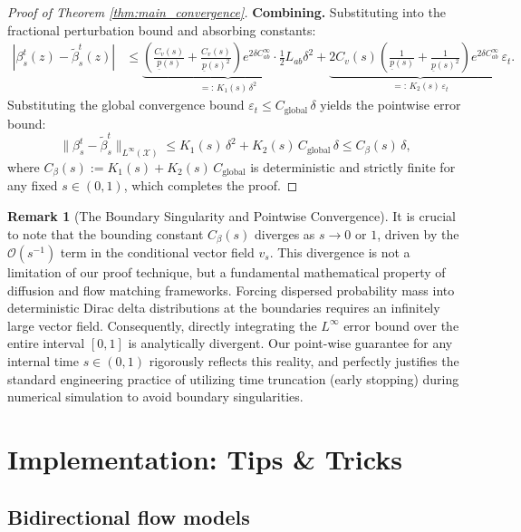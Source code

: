 \documentclass[11pt]{article}
\theoremstyle{definition}
\newtheorem{remark}[theorem]{Remark}
\numberwithin{equation}{section}%
\begin{document}
\begin{proof}[Proof of Theorem \ref{thm:main_convergence}]
\textbf{Combining.} Substituting into the fractional perturbation bound and absorbing constants:
\begin{align*}
|\beta_s^t(z) - \tilde{\beta}_s^t(z)|
&\le \underbrace{\left(\frac{C_v(s)}{\underline{p}(s)} + \frac{C_v(s)}{\underline{p}(s)^2}\right) e^{2\delta C_{ab}^\infty} \cdot \tfrac{1}{2}L_{ab}\delta^2}_{=:\,K_1(s)\,\delta^2}
+ \underbrace{2C_v(s)\!\left(\frac{1}{\underline{p}(s)} + \frac{1}{\underline{p}(s)^2}\right) e^{2\delta C_{ab}^\infty}\,\varepsilon_t}_{=:\,K_2(s)\,\varepsilon_t}.
\end{align*}
Substituting the global convergence bound $\varepsilon_t \le C_{\mathrm{global}}\,\delta$ yields the pointwise error bound:
\begin{equation}
\label{eq:pointwise_beta_bound}
\|\beta_s^t - \tilde{\beta}_s^t\|_{L^\infty(\mathcal{X})} \le K_1(s)\,\delta^2 + K_2(s)\,C_{\mathrm{global}}\,\delta \le C_\beta(s)\,\delta,
\end{equation}
where $C_\beta(s) := K_1(s) + K_2(s)\,C_{\mathrm{global}}$ is deterministic and strictly finite for any fixed $s \in (0,1)$, which completes the proof.
\end{proof}

\begin{remark}[The Boundary Singularity and Pointwise Convergence]
\label{rmk:boundary_singularity}
It is crucial to note that the bounding constant $C_\beta(s)$ diverges as $s \to 0$ or $1$, driven by the $\mathcal{O}(s^{-1})$ term in the conditional vector field $v_s$. This divergence is not a limitation of our proof technique, but a fundamental mathematical property of diffusion and flow matching frameworks. Forcing dispersed probability mass into deterministic Dirac delta distributions at the boundaries requires an infinitely large vector field. Consequently, directly integrating the $L^\infty$ error bound over the entire interval $[0,1]$ is analytically divergent. Our point-wise guarantee for any internal time $s \in (0,1)$ rigorously reflects this reality, and perfectly justifies the standard engineering practice of utilizing time truncation (early stopping) during numerical simulation to avoid boundary singularities.
\end{remark}

\section{Implementation: Tips \& Tricks}
\label{app:tips}

\subsection{Bidirectional flow models}
\end{document}
